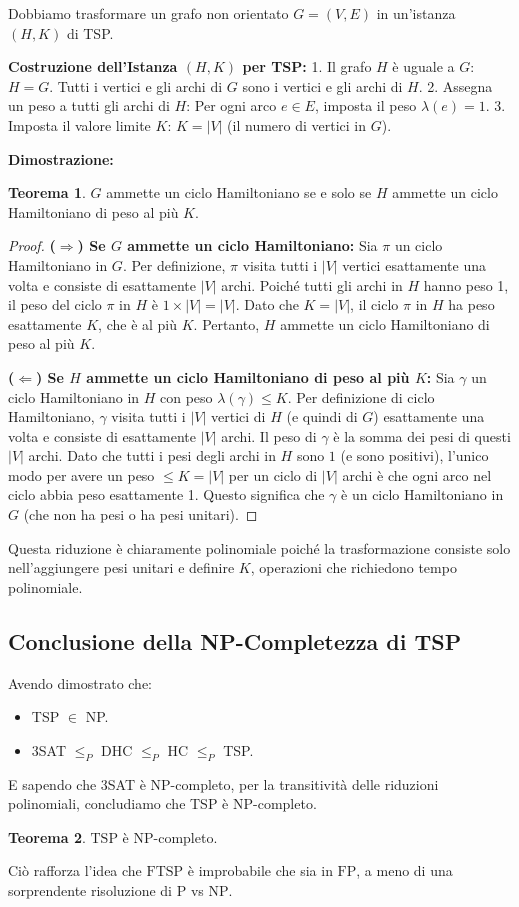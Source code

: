 \documentclass[a4paper]{article}
\theoremstyle{definition} %
\newtheorem{theorem}{Teorema}
\begin{document}
Dobbiamo trasformare un grafo non orientato $G=(V, E)$ in un'istanza $(H, K)$ di TSP.

\textbf{Costruzione dell'Istanza $(H, K)$ per TSP:}
1.  Il grafo $H$ è uguale a $G$: $H=G$. Tutti i vertici e gli archi di $G$ sono i vertici e gli archi di $H$.
2.  Assegna un peso a tutti gli archi di $H$: Per ogni arco $e \in E$, imposta il peso $\lambda(e)=1$.
3.  Imposta il valore limite $K$: $K=|V|$ (il numero di vertici in $G$).

\textbf{Dimostrazione:}
\begin{theorem}
$G$ ammette un ciclo Hamiltoniano se e solo se $H$ ammette un ciclo Hamiltoniano di peso al più $K$.
\end{theorem}
\begin{proof}
\textbf{($\Rightarrow$) Se $G$ ammette un ciclo Hamiltoniano:}
Sia $\pi$ un ciclo Hamiltoniano in $G$. Per definizione, $\pi$ visita tutti i $|V|$ vertici esattamente una volta e consiste di esattamente $|V|$ archi.
Poiché tutti gli archi in $H$ hanno peso 1, il peso del ciclo $\pi$ in $H$ è $1 \times |V| = |V|$.
Dato che $K=|V|$, il ciclo $\pi$ in $H$ ha peso esattamente $K$, che è al più $K$.
Pertanto, $H$ ammette un ciclo Hamiltoniano di peso al più $K$.

\textbf{($\Leftarrow$) Se $H$ ammette un ciclo Hamiltoniano di peso al più $K$:}
Sia $\gamma$ un ciclo Hamiltoniano in $H$ con peso $\lambda(\gamma) \le K$.
Per definizione di ciclo Hamiltoniano, $\gamma$ visita tutti i $|V|$ vertici di $H$ (e quindi di $G$) esattamente una volta e consiste di esattamente $|V|$ archi.
Il peso di $\gamma$ è la somma dei pesi di questi $|V|$ archi. Dato che tutti i pesi degli archi in $H$ sono $1$ (e sono positivi), l'unico modo per avere un peso $\le K=|V|$ per un ciclo di $|V|$ archi è che ogni arco nel ciclo abbia peso esattamente 1.
Questo significa che $\gamma$ è un ciclo Hamiltoniano in $G$ (che non ha pesi o ha pesi unitari).
\end{proof}

Questa riduzione è chiaramente polinomiale poiché la trasformazione consiste solo nell'aggiungere pesi unitari e definire $K$, operazioni che richiedono tempo polinomiale.

\subsection{Conclusione della NP-Completezza di TSP}

Avendo dimostrato che:
\begin{itemize}
    \item TSP $\in$ NP.
    \item 3SAT $\le_P$ DHC $\le_P$ HC $\le_P$ TSP.
\end{itemize}
E sapendo che 3SAT è NP-completo, per la transitività delle riduzioni polinomiali, concludiamo che TSP è NP-completo.

\begin{theorem}
$\text{TSP}$ è $\text{NP}$-completo.
\end{theorem}

Ciò rafforza l'idea che $\text{FTSP}$ è improbabile che sia in $\text{FP}$, a meno di una sorprendente risoluzione di $\text{P}$ vs $\text{NP}$.
\end{document}
